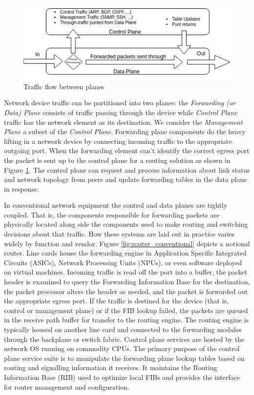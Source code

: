\begin{figure}[ht]
\centering
\includegraphics[width=.8\linewidth]{resource/img/ch_background/sdn_analytics/router_flow_2.png}
\caption{Traffic flow between planes}
\label{fig:router_flow}
\end{figure} 
Network device traffic can be partitioned into two planes\cite{Khosravi_Anderson_2003}: the \textit{Forwarding (or Data) Plane} consists of traffic passing through the device while \textit{Control Plane} traffic has the network element as its destination. We consider the \textit{Management Plane} a subset of the \textit{Control Plane}. Forwarding plane components do the heavy lifting in a network device by connecting incoming traffic to the appropriate outgoing port. When the forwarding element can't identify the correct egress port the packet is sent up to the control plane for a routing solution as shown in Figure \ref{fig:router_flow}. The control plane can request and process information about link status and network topology from peers and update forwarding tables in the data plane in response. 

In conventional network equipment the control and data planes are tightly coupled. That is, the components responsible for forwarding packets are physically located along side the components used to make routing and switching decisions about that traffic. How these systems are laid out in practice varies widely by function and vendor. Figure \ref{fig:router_conventional} depicts a notional router. Line cards house the forwarding engine in Application Specific Integrated Circuits (ASICs), Network Processing Units (NPUs), or even software deployed on virtual machines. Incoming traffic is read off the port into a buffer, the packet header is examined to query the Forwarding Information Base for the destination, the packet processor alters the header as needed, and the packet is forwarded out the appropriate egress port. If the traffic is destined for the device (that is, control or management plane) or if the FIB lookup failed, the packets are queued in the receive path buffer for transfer to the routing engine. The routing engine is typically housed on another line card and connected to the forwarding modules through the backplane or switch fabric. Control plane services are hosted by the network OS running on commodity CPUs. The primary purpose of the control plane service suite is to manipulate the forwarding plane lookup tables based on routing and signalling information it receives. It maintains the Routing Information Base (RIB) used to optimize local FIBs and provides the interface for router management and configuration. 

